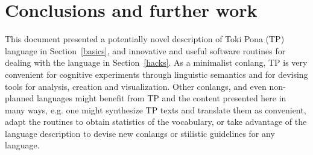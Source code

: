\section{Conclusions and further work}\label{conc}
This document presented a potentially novel description of Toki Pona (TP)
language in Section~\ref{basics}, and innovative and useful software routines for dealing with
the language in Section~\ref{hacks}.
As a minimalist conlang, TP is very convenient for cognitive
experiments
through linguistic semantics and
for devising tools for analysis, creation and visualization.
Other conlangs, and even non-planned languages might benefit from
TP and the content presented here in many ways, e.g. one might
synthesize TP texts and translate them as convenient,
adapt the routines to obtain statistics of the vocabulary,
or take advantage of the language description to devise new conlangs
or stilistic guidelines for any language.


